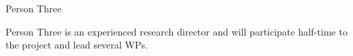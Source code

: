 \begin{participant}[type=leadPI,PM=24,gender=female,salary=5500]{Person Three}

  Person Three is an experienced research director and will participate
  half-time to the project and lead several WPs.

\end{participant}

